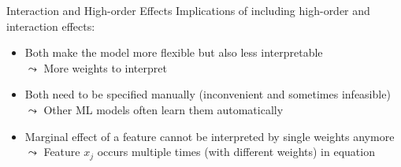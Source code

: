 \documentclass[11pt,compress,t,notes=noshow, aspectratio=169, xcolor=table]{beamer}
\begin{document}
\begin{frame}{Interaction and High-order Effects}
\pause
Implications of including high-order and interaction effects: 
\begin{itemize}
    \item Both make the model more flexible but also less interpretable\\
    $\leadsto$ More weights to interpret
    \item Both need to be specified manually (inconvenient and sometimes infeasible)\\
    $\leadsto$ Other ML models often learn them automatically
    \item Marginal effect of a feature cannot be interpreted by single weights anymore\\
$\leadsto$ Feature $x_j$ occurs multiple times (with different weights) in equation
\end{itemize}


\end{frame}


\end{document}
